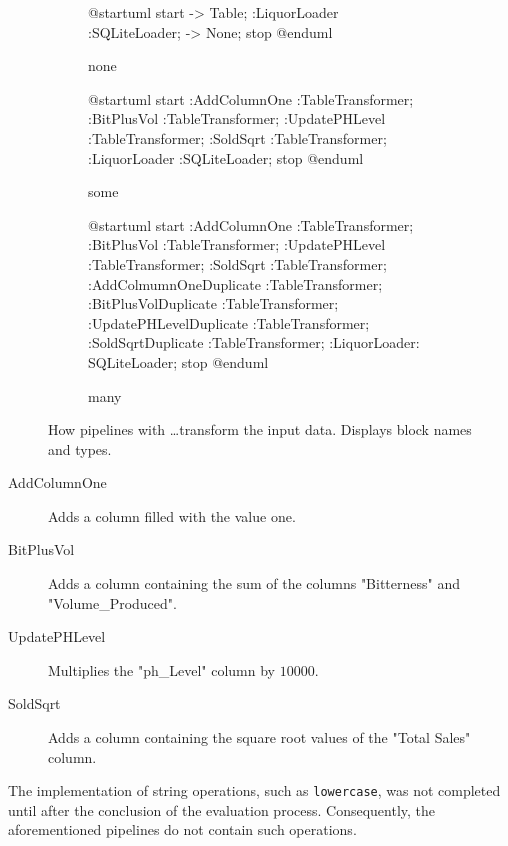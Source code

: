 \begin{figure}
	\begin{subfigure}[h]{0.3\linewidth}
		\begin{plantuml}
			@startuml
			start
			-> Table;
			:LiquorLoader :SQLiteLoader;
			-> None;
			stop
			@enduml
		\end{plantuml}
		\caption{none}
	\end{subfigure}
	\hfill
	\begin{subfigure}[h]{0.3\linewidth}
		\begin{plantuml}
			@startuml
			start
			:AddColumnOne :TableTransformer;
			:BitPlusVol :TableTransformer;
			:UpdatePHLevel :TableTransformer;
			:SoldSqrt :TableTransformer;
			:LiquorLoader :SQLiteLoader;
			stop
			@enduml
		\end{plantuml}
		\caption{some}
	\end{subfigure}
	\hfill
	\begin{subfigure}[h]{0.3\linewidth}
		\begin{plantuml}
			@startuml
			start
			:AddColumnOne :TableTransformer;
			:BitPlusVol :TableTransformer;
			:UpdatePHLevel :TableTransformer;
			:SoldSqrt :TableTransformer;
			:AddColmumnOneDuplicate :TableTransformer;
			:BitPlusVolDuplicate :TableTransformer;
			:UpdatePHLevelDuplicate :TableTransformer;
			:SoldSqrtDuplicate :TableTransformer;
			:LiquorLoader: SQLiteLoader;
			stop
			@enduml
		\end{plantuml}
		\caption{many}
	\end{subfigure}
	\caption{How pipelines with \dots transform the input data.
		Displays block names and types.
	}
	\label{fig:uml:pipelines:transforms}
\end{figure}

\begin{description}
	\item[AddColumnOne] Adds a column filled with the value one.
	\item[BitPlusVol] Adds a column containing the sum of the columns "Bitterness" and "Volume\_Produced".
	\item[UpdatePHLevel] Multiplies the "ph\_Level" column by $10 000$.
	\item[SoldSqrt] Adds a column containing the square root values of the "Total Sales" column.
\end{description}

The implementation of string operations, such as \Verb|lowercase|, was not completed until after the conclusion of the evaluation process.
Consequently, the aforementioned pipelines do not contain such operations.


